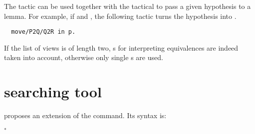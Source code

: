 The tactic  can be used together with the 
tactical to pass a given hypothesis to a lemma. For example, if
 and , the following
tactic turns the hypothesis  into .
\begin{lstlisting}
  move/P2Q/Q2R in p.
\end{lstlisting}

If the list of views is of length two, s for interpreting
equivalences are indeed taken into account, otherwise only single
s are used.
\section{\ssr{} searching tool}

\ssr{} proposes an extension of the  command. Its syntax is:

\begin{center}
          $^*$ 
\end{center}


